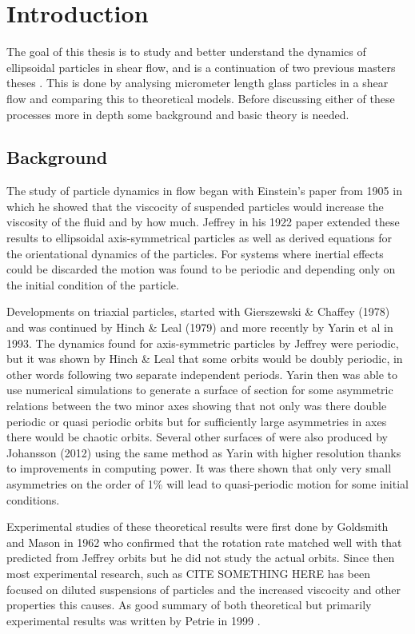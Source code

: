 \section{Introduction}
The goal of this thesis is to study and better understand the dynamics of ellipsoidal particles in shear flow, and is a continuation of two previous masters theses \cite{AntonThesis, JonasThesis}. This is done by analysing micrometer length glass particles in a shear flow and comparing this to theoretical models. Before discussing either of these processes more in depth some background and basic theory is needed.

\subsection{Background}
The study of particle dynamics in flow began with Einstein's paper from 1905 \cite{Einstein} in which he showed that the viscocity of suspended particles would increase the viscosity of the fluid and by how much. Jeffrey in his 1922 paper \cite{Jeffrey} extended these results to ellipsoidal axis-symmetrical particles as well as derived equations for the orientational dynamics of the particles. For systems where inertial effects could be discarded the motion was found to be periodic and depending only on the initial condition of the particle.

Developments on triaxial particles, started with Gierszewski \& Chaffey (1978)\cite{Chaffey} and was continued by Hinch \& Leal (1979)\cite{Leal} and more recently by Yarin et al in 1993\cite{Yarin}. 
The dynamics found for axis-symmetric particles by Jeffrey were periodic, but it was shown by Hinch \& Leal that some orbits would be doubly periodic, in other words following two separate independent periods. 
Yarin then was able to use numerical simulations to generate a surface of section \cite{SurfaceOfSection} for some asymmetric relations between the two minor axes showing that not only was there double periodic or quasi periodic orbits but for sufficiently large asymmetries in axes there would be chaotic orbits. 
Several other surfaces of were also produced by Johansson (2012)\cite{AntonThesis} using the same method as Yarin with higher resolution thanks to improvements in computing power. It was there shown that only very small asymmetries on the order of 1\% will lead to quasi-periodic motion for some initial conditions.

Experimental studies of these theoretical results were first done by Goldsmith and Mason in 1962\cite{Mason} who confirmed that the rotation rate matched well with that predicted from Jeffrey orbits but he did not study the actual orbits. Since then most experimental research, such as CITE SOMETHING HERE has been focused on diluted suspensions of particles and the increased viscocity and other properties this causes. As good summary of both theoretical but primarily experimental results was written by Petrie in 1999 \cite{Petrie}.

